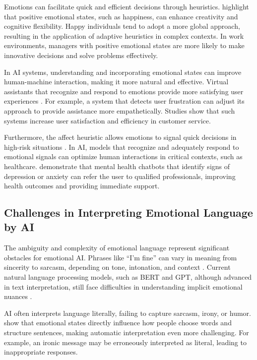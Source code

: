 \documentclass[a4paper,12pt]{report}
\begin{document}
	Emotions can facilitate quick and efficient decisions through heuristics. \textcite{isen2001} highlight that positive emotional states, such as happiness, can enhance creativity and cognitive flexibility. Happy individuals tend to adopt a more global approach, resulting in the application of adaptive heuristics in complex contexts. In work environments, managers with positive emotional states are more likely to make innovative decisions and solve problems effectively.
	
	In AI systems, understanding and incorporating emotional states can improve human-machine interaction, making it more natural and effective. Virtual assistants that recognize and respond to emotions provide more satisfying user experiences \parencite{picard1997}. For example, a system that detects user frustration can adjust its approach to provide assistance more empathetically. Studies show that such systems increase user satisfaction and efficiency in customer service.
	
	Furthermore, the affect heuristic allows emotions to signal quick decisions in high-risk situations \parencite{slovic2007}. In AI, models that recognize and adequately respond to emotional signals can optimize human interactions in critical contexts, such as healthcare. \textcite{miner2016} demonstrate that mental health chatbots that identify signs of depression or anxiety can refer the user to qualified professionals, improving health outcomes and providing immediate support.
	
	\subsection{Challenges in Interpreting Emotional Language by AI}
	
	The ambiguity and complexity of emotional language represent significant obstacles for emotional AI. Phrases like “I'm fine” can vary in meaning from sincerity to sarcasm, depending on tone, intonation, and context \parencite{pessoa2008}. Current natural language processing models, such as BERT and GPT, although advanced in text interpretation, still face difficulties in understanding implicit emotional nuances \parencite{russell2020}.
	
	AI often interprets language literally, failing to capture sarcasm, irony, or humor. \textcite{beukeboom2006} show that emotional states directly influence how people choose words and structure sentences, making automatic interpretation even more challenging. For example, an ironic message may be erroneously interpreted as literal, leading to inappropriate responses.
	
\end{document}
